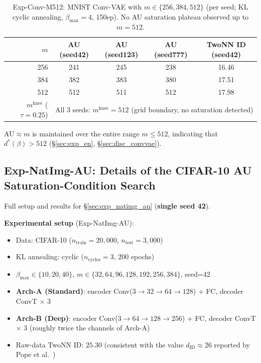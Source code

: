 \documentclass[make,article,submit,pdftex,moreauthors]{Definitions/mdpi}
\newcommand{\mknee}{m^{\mathrm{knee}}}
\begin{document}
\begin{table}[H]
\centering
\caption{Exp-Conv-M512: MNIST Conv-VAE with $m \in \{256, 384, 512\}$ (per seed; KL cyclic annealing, $\beta_\mathrm{max}=4$, 150ep). No AU saturation plateau observed up to $m=512$.}
\label{tab:en_ext}
\small
\begin{tabular}{r ccc c}
\toprule
$m$ & AU (seed42) & AU (seed123) & AU (seed777) & TwoNN ID (seed42) \\
\midrule
256 & 241 & 245 & 238 & 16.46 \\
384 & 382 & 383 & 380 & 17.51 \\
512 & 512 & 511 & 512 & 17.98 \\
\midrule
$\mknee$ ($\tau=0.25$) & \multicolumn{4}{c}{All 3 seeds: $\mknee=512$ (grid boundary, no saturation detected)} \\
\bottomrule
\end{tabular}
\end{table}

AU$\approx m$ is maintained over the entire range $m \leq 512$, indicating that $d^*(\beta) > 512$
(\S\ref{sec:exp_en}, \S\ref{sec:disc_convvae}).

\subsection*{Exp-NatImg-AU: Details of the CIFAR-10 AU Saturation-Condition Search}

Full setup and results for \S\ref{sec:exp_natimg_au} (\textbf{single seed 42}).

\textbf{Experimental setup} (Exp-NatImg-AU):
\begin{itemize}
  \item Data: CIFAR-10 ($n_{\mathrm{train}}=20{,}000$, $n_{\mathrm{test}}=3{,}000$)
  \item KL annealing: cyclic ($n_{\mathrm{cycles}}=3$, 200 epochs)
  \item $\beta_{\max} \in \{10, 20, 40\}$, $m \in \{32, 64, 96, 128, 192, 256, 384\}$, seed=42
  \item \textbf{Arch-A (Standard)}: encoder Conv($3{\to}32{\to}64{\to}128$) + FC, decoder ConvT $\times$ 3
  \item \textbf{Arch-B (Deep)}: encoder Conv($3{\to}64{\to}128{\to}256$) + FC, decoder ConvT $\times$ 3 (roughly twice the channels of Arch-A)
  \item Raw-data TwoNN ID: $25.30$ (consistent with the value $d_\mathrm{ID} \approx 26$ reported by Pope et al.~\cite{pope2021intrinsic})
\end{itemize}
\end{document}
